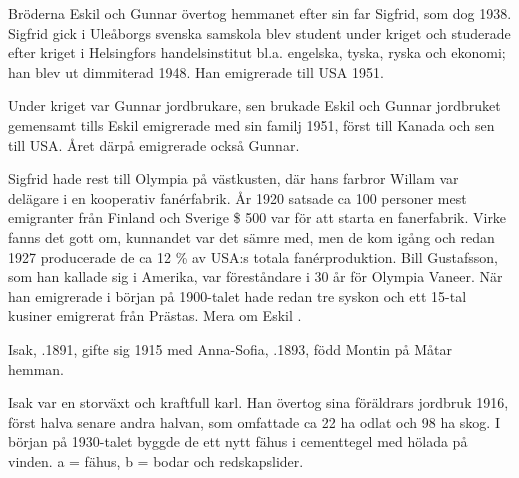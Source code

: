 Bröderna Eskil och Gunnar övertog hemmanet efter sin far Sigfrid, som dog 1938. Sigfrid gick i Uleåborgs svenska samskola blev student under kriget och studerade efter kriget i Helsingfors handelsinstitut bl.a. engelska, tyska, ryska och ekonomi; han blev ut dimmiterad 1948. Han emigrerade till USA 1951.

Under kriget var Gunnar jordbrukare, sen brukade Eskil och Gunnar jordbruket gemensamt tills Eskil emigrerade med sin familj 1951, först till Kanada och sen till USA. Året därpå emigrerade också Gunnar.

Sigfrid hade rest till Olympia på västkusten, där hans farbror Willam var delägare i en kooperativ fanérfabrik. År 1920 satsade ca 100 personer mest emigranter från Finland och Sverige \$ 500 var för att starta en fanerfabrik. Virke fanns det gott om, kunnandet var det sämre med, men de kom igång och redan 1927 producerade de ca 12 \% av USA:s totala fanérproduktion. Bill Gustafsson, som han kallade sig i Amerika, var föreståndare i 30 år för Olympia Vaneer. När han emigrerade i början på 1900-talet hade redan tre syskon och ett 15-tal kusiner emigrerat från Prästas. Mera om Eskil .


Isak, .1891, gifte sig 1915 med Anna-Sofia, .1893, född Montin på Måtar hemman.
\begin{jhchildren}
  \item {}
  \item {}
  \item {}
  \item {}
  \item {}
  \item {}
  \item {}
\end{jhchildren}
Isak var en storväxt och kraftfull karl. Han övertog sina föräldrars jordbruk 1916, först halva senare andra halvan, som omfattade ca 22 ha odlat och 98 ha skog. I början på 1930-talet byggde de ett nytt fähus i cementtegel med hölada på vinden. a = fähus, b = bodar och redskapslider.

